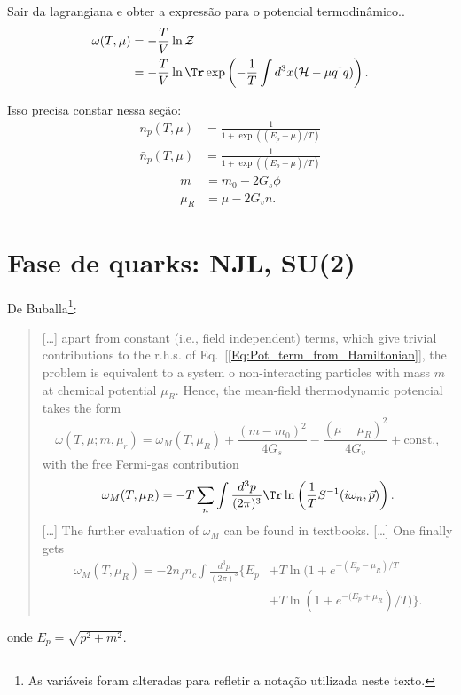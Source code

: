 Sair da lagrangiana e obter a expressão para o potencial termodinâmico.\cite{Asakawa1989}.
\begin{align}
	\omega(T, \mu) &= -\frac{T}{V} \ln\mathcal{Z} \\
	&= -\frac{T}{V} \ln\Tr\exp\left(-\frac{1}{T} \int d^3 x(\mathcal{H} - \mu q^\dagger q)\right). \label{Eq:Pot_term_from_Hamiltonian}
\end{align}

Isso precisa constar nessa seção:
\begin{align}
	n_p(T, \mu) &= \frac{1}{1+\exp((E_p - \mu)/T)} \\
	\bar{n}_p(T, \mu) &= \frac{1}{1 + \exp((E_p + \mu)/T)}
\end{align}
\begin{align}\label{Eq:Def_m_mu_r}
	m &= m_0 - 2 G_s \phi \\
	\mu_R &= \mu - 2 G_v n.
\end{align}

\section{Fase de quarks: NJL, SU(2)}

De Buballa\cite{Buballa}\footnote{As variáveis foram alteradas para refletir a notação utilizada neste texto.}:
\begin{quote}
	[\dots] apart from constant (i.e., field independent) terms, which give trivial contributions to the r.h.s. of Eq.~[\eqref{Eq:Pot_term_from_Hamiltonian}], the problem is equivalent to a system o non-interacting particles with mass $m$ at chemical potential $\mu_R$. Hence, the mean-field thermodynamic potencial takes the form
	\begin{equation}\label{Eq:Pot_Termo_Temp_Finita}
		\omega(T, \mu; m, \mu_r) = \omega_M(T, \mu_R) + \frac{(m - m_0)^2}{4G_s} - \frac{(\mu - \mu_R)^2}{4G_v} + \textrm{const.},
	\end{equation}
	with the free Fermi-gas contribution
	\begin{equation}
		\omega_M(T, \mu_R) = -T \sum_n \int \frac{d^3p}{(2\pi)^3} \Tr\ln\left(\frac{1}{T}S^{-1}(i\omega_n,\vec{p})\right).
	\end{equation}
	[\dots]
	The further evaluation of $\omega_M$ can be found in textbooks. [\dots] One finally gets
	\begin{equation}
	\begin{split}\label{Eq:Por_Termo_Temp_Finita_Fermi_Gas_Contrib}
		\omega_M(T, \mu_R) = -2 n_f n_c \int \frac{d^3p}{(2\pi)^3} \{E_p &+ T\ln(1+e^{-(E_p-\mu_R)/T} \\
		&+ T\ln(1 + e^{-(E_p+\mu_R})/T)\}.
	\end{split}
	\end{equation}
\end{quote}
%
onde $E_p = \sqrt{p^2 + m^2}$.

